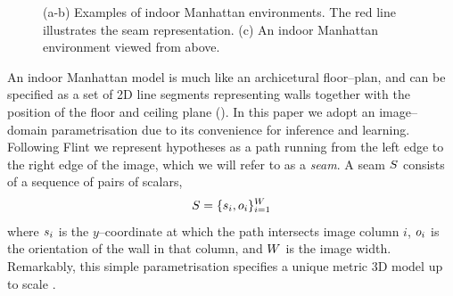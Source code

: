 \begin{figure}[tb]
  \centering
  \caption{(a-b) Examples of indoor Manhattan environments. The red
    line illustrates the seam representation. (c)
    An indoor Manhattan environment viewed from above.}
  \label{fig:indoor-manhattan}
\end{figure}

An indoor Manhattan model is much like an archicetural floor--plan,
and can be specified as a set of 2D line segments representing walls
together with the position of the floor and ceiling plane
(). In this paper we adopt an image--domain
parametrisation due to its convenience for inference and
learning. Following Flint \etal \cite{Flint11} we represent hypotheses
as a path running from the left edge to the right edge of the image,
which we will refer to as a \textit{seam}. A seam $S$ consists of
a sequence of pairs of scalars,
\begin{equation}
  S = \{s_i,o_i\}_{i=1}^{W}
\end{equation}
where $s_i$ is the $y$--coordinate at which the path intersects
image column $i$, $o_i$ is the orientation of the wall in that
column, and $W$ is the image width. Remarkably, this simple
parametrisation specifies a unique metric 3D model up to scale
\cite{Flint11}.

